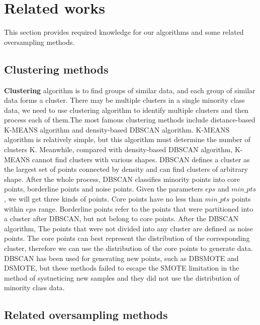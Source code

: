 \documentclass[ida]{iosart2x}
\begin{document}
\section{Related works}
This section provides required knowledge for our algorithms and some related oversampling methods.
\subsection{Clustering methods}

\textbf{Clustering} algorithm is to find groups of similar data, and each group of similar data forms a cluster.
There may be multiple clusters in a single minority class data, 
we need to use clustering algorithm to identify multiple clusters
 and then process each of them.The most famous clustering methods include distance-based K-MEANS algorithm and density-based DBSCAN algorithm.
K-MEANS algorithm is relatively simple, but this algorithm must determine the number of clusters K.
Meanwhile, compared with density-based DBSCAN algorithm, K-MEANS cannot find clusters with various shapes.
DBSCAN defines a cluster as the largest set of points
 connected by density and can find clusters of arbitrary shape. After the whole process,
  DBSCAN classifies minority points into core points,
  borderline points and noise points.
 Given the parameters $eps$ and $min\_pts$, we will get three kinds of points. 
 Core points have no less than
  $min\_pts$ points within $eps$ range. 
  Borderline points refer to the points that were partitioned into a cluster after DBSCAN,
  but not belong to core points. After the DBSCAN algorithm, The points that were not divided into any cluster are 
  defined as noise points.
The core points can best represent the distribution of the corresponding cluster, 
therefore we can use the distribution of the core points to generate data.
DBSCAN has been used for generating new points, such as DBSMOTE\cite{2012DBSMOTE} and
DSMOTE\cite{2019Over}, but these methods failed to escape the SMOTE limitation in 
the method of systneticing new samples and they did not use the distribution of minority class data.

\subsection{Related oversampling methods}
\end{document}

